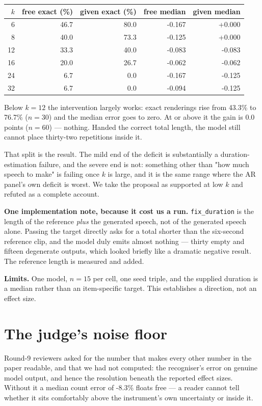 \documentclass[11pt]{article}
\begin{document}
\begin{center}
\begin{tabular}{rrrrr}
\toprule
$k$ & free exact (\%) & given exact (\%) & free median & given median \\
\midrule
6 & 46.7 & 80.0 & -0.167 & +0.000 \\
8 & 40.0 & 73.3 & -0.125 & +0.000 \\
12 & 33.3 & 40.0 & -0.083 & -0.083 \\
16 & 20.0 & 26.7 & -0.062 & -0.062 \\
24 & 6.7 & 0.0 & -0.167 & -0.125 \\
32 & 6.7 & 0.0 & -0.094 & -0.125 \\
\bottomrule
\end{tabular}
\end{center}

Below $k=12$ the intervention largely works: exact renderings rise from
43.3\% to 76.7\% ($n=30$) and the median error goes to zero.
At or above it the gain is 0.0 points ($n=60$) --- nothing. Handed
the correct total length, the model still cannot place thirty-two repetitions
inside it.

That split is the result. The mild end of the deficit is substantially a
duration-estimation failure, and the severe end is not: something other than
"how much speech to make" is failing once $k$ is large, and it is the same range
where the AR panel's own deficit is worst. We take the proposal as supported at
low $k$ and refuted as a complete account.

\noindent\textbf{One implementation note, because it cost us a run.}
\texttt{fix\_duration} is the length of the reference \emph{plus} the generated speech,
not of the generated speech alone. Passing the target directly asks for a total
shorter than the six-second reference clip, and the model duly emits almost
nothing --- thirty empty and fifteen degenerate outputs, which looked briefly
like a dramatic negative result. The reference length is measured and added.

\noindent\textbf{Limits.} One model, $n=15$ per cell, one seed triple, and the
supplied duration is a median rather than an item-specific target. This
establishes a direction, not an effect size.

\section{The judge's noise floor}
\label{sec:s14}

Round-9 reviewers asked for the number that makes every other number in the paper
readable, and that we had not computed: the recogniser's error on genuine model
output, and hence the resolution beneath the reported effect sizes. Without it a
median count error of -8.3\% floats free --- a reader cannot tell whether it
sits comfortably above the instrument's own uncertainty or inside it.
\end{document}
